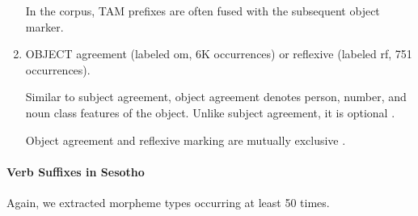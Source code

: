 \documentclass[11pt,letterpaper]{article}
\begin{document}
\begin{enumerate}
    
    
    In the corpus, TAM prefixes are often fused with the subsequent object marker.
    
    
    
    \item OBJECT agreement (labeled om, 6K occurrences) or reflexive (labeled rf, 751 occurrences).
    
    Similar to subject agreement, object agreement denotes person, number, and noun class features of the object.
    Unlike subject agreement, it is optional \cite[]{doke1967textbook}.
    
    Object agreement and reflexive marking are mutually exclusive \cite[p. 165]{guma1971outline}.
\end{enumerate}









\paragraph{Verb Suffixes in Sesotho}

Again, we extracted morpheme types occurring at least 50 times.
\end{document}
